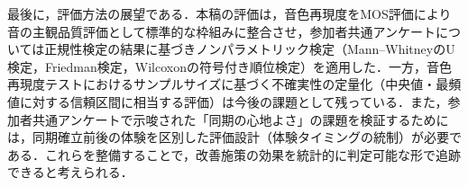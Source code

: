 最後に，評価方法の展望である．本稿の評価は，音色再現度をMOS評価により音の主観品質評価として標準的な枠組みに整合させ，参加者共通アンケートについては正規性検定の結果に基づきノンパラメトリック検定（Mann--WhitneyのU検定，Friedman検定，Wilcoxonの符号付き順位検定）を適用した．一方，音色再現度テストにおけるサンプルサイズに基づく不確実性の定量化（中央値・最頻値に対する信頼区間に相当する評価）は今後の課題として残っている．また，参加者共通アンケートで示唆された「同期の心地よさ」の課題を検証するためには，同期確立前後の体験を区別した評価設計（体験タイミングの統制）が必要である．これらを整備することで，改善施策の効果を統計的に判定可能な形で追跡できると考えられる．

\FloatBarrier
